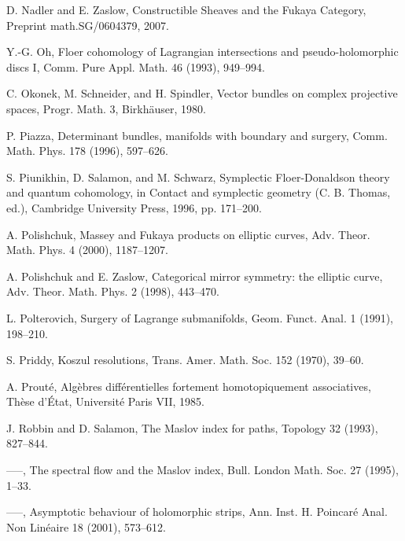\begin{list}{}{\setlength{\leftmargin}{3em}\setlength{\labelwidth}{2.5em}\setlength{\itemsep}{.5em}\small}
\item[\hypertarget{bib:102}{[102]}] D. Nadler and E. Zaslow, Constructible Sheaves and the Fukaya Category, Preprint math.SG/0604379, 2007. 
\item[\hypertarget{bib:103}{[103]}] Y.-G. Oh, Floer cohomology of Lagrangian intersections and pseudo-holomorphic discs I, Comm. Pure Appl. Math. 46 (1993), 949–994. 
\item[\hypertarget{bib:104}{[104]}] C. Okonek, M. Schneider, and H. Spindler, Vector bundles on complex projective spaces, Progr. Math. 3, Birkhäuser, 1980. 
\item[\hypertarget{bib:105}{[105]}] P. Piazza, Determinant bundles, manifolds with boundary and surgery, Comm. Math. Phys. 178 (1996), 597–626. 
\item[\hypertarget{bib:106}{[106]}] S. Piunikhin, D. Salamon, and M. Schwarz, Symplectic Floer-Donaldson theory and quantum cohomology, in Contact and symplectic geometry (C. B. Thomas, ed.), Cambridge University Press, 1996, pp. 171–200. 
\item[\hypertarget{bib:107}{[107]}] A. Polishchuk, Massey and Fukaya products on elliptic curves, Adv. Theor. Math. Phys. 4 (2000), 1187–1207. 
\item[\hypertarget{bib:108}{[108]}] A. Polishchuk and E. Zaslow, Categorical mirror symmetry: the elliptic curve, Adv. Theor. Math. Phys. 2 (1998), 443–470. 
\item[\hypertarget{bib:109}{[109]}] L. Polterovich, Surgery of Lagrange submanifolds, Geom. Funct. Anal. 1 (1991), 198–210. 
\item[\hypertarget{bib:110}{[110]}] S. Priddy, Koszul resolutions, Trans. Amer. Math. Soc. 152 (1970), 39–60. 
\item[\hypertarget{bib:111}{[111]}] A. Prouté, Algèbres différentielles fortement homotopiquement associatives, Thèse d'État, Université Paris VII, 1985. 
\item[\hypertarget{bib:112}{[112]}] J. Robbin and D. Salamon, The Maslov index for paths, Topology 32 (1993), 827–844. 
\item[\hypertarget{bib:113}{[113]}] —–, The spectral flow and the Maslov index, Bull. London Math. Soc. 27 (1995), 1–33. 
\item[\hypertarget{bib:114}{[114]}] —–, Asymptotic behaviour of holomorphic strips, Ann. Inst. H. Poincaré Anal. Non Linéaire 18 (2001), 573–612. 

\end{list}
